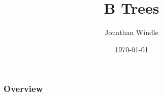 \documentclass{beamer}
\title[B Trees]{B Trees} %
\author{Jonathan Windle} %
\institute[UEA] %
{
University of East Anglia \\ %
\medskip
\textit{J.Windle@uea.ac.uk} %
}
\date{\today} %
\begin{document}
\begin{frame}
\titlepage %
\end{frame}

\begin{frame}[allowframebreaks]
\frametitle{Overview} %
\tableofcontents %
\end{frame} 

\end{document}
